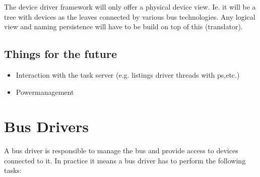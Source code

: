 The device driver framework will only offer a physical device view.
Ie. it will be a tree with devices as the leaves connected by
various bus technologies.  Any logical view and naming persistence
will have to be build on top of this (translator).

\subsection{Things for the future}

\begin{itemize}
\item Interaction with the task server (e.g. listings driver threads 
  with ps,etc.)
\item Powermanagement
\end{itemize}


\section{Bus Drivers}

A bus driver is responsible to manage the bus and provide access to
devices connected to it.  In practice it means a bus driver has to
perform the following tasks:


